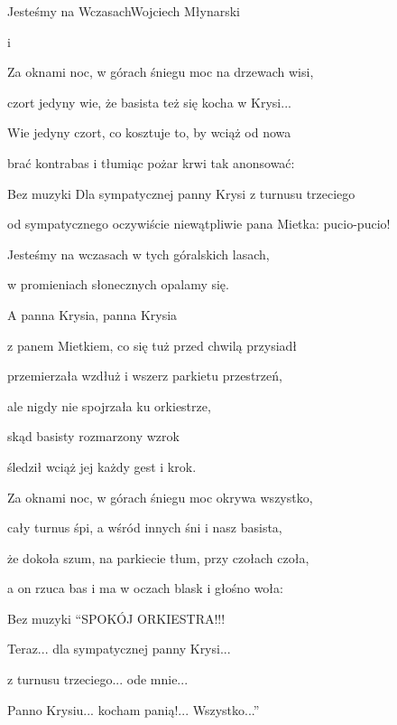 \begin{song}{Jesteśmy na Wczasach}{}{}{Wojciech Młynarski}{}{}
\begin{SBVerse}
     i 
  \end{SBVerse}

  \begin{SBVerse}
    Za oknami noc, w górach śniegu moc na drzewach wisi,

    czort jedyny wie, że basista też się kocha w Krysi...

    Wie jedyny czort, co kosztuje to, by wciąż od nowa

    brać kontrabas i tłumiąc pożar krwi tak anonsować:
  \end{SBVerse}

  \begin{SBBracket}{Bez muzyki}
    Dla sympatycznej panny Krysi z turnusu trzeciego

    od sympatycznego oczywiście niewątpliwie pana Mietka: pucio-pucio!
  \end{SBBracket}
  \begin{SBChorus}
    Jesteśmy na wczasach w tych góralskich lasach,

    w promieniach słonecznych opalamy się.
  \end{SBChorus}
  \begin{SBVerse}
    A panna Krysia, panna Krysia

    z panem Mietkiem, co się tuż przed chwilą przysiadł

    przemierzała wzdłuż i wszerz parkietu przestrzeń,

    ale nigdy nie spojrzała ku orkiestrze,

    skąd basisty rozmarzony wzrok

    śledził wciąż jej każdy gest i krok.
  \end{SBVerse}
  \begin{SBChorus}
    Za oknami noc, w górach śniegu moc okrywa wszystko,

    cały turnus śpi, a wśród innych śni i nasz basista,

    że dokoła szum, na parkiecie tłum, przy czołach czoła,

    a on rzuca bas i ma w oczach blask i głośno woła:
  \end{SBChorus}

  \begin{SBBracket}{Bez muzyki}
    ``SPOKÓJ ORKIESTRA!!!

    Teraz... dla sympatycznej panny Krysi...

    z turnusu trzeciego... ode mnie...

    Panno Krysiu... kocham panią!... Wszystko...''
  \end{SBBracket}


\end{song}
